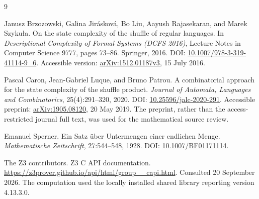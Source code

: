 \documentclass[11pt,letterpaper]{article}
\numberwithin{equation}{section}
\theoremstyle{definition}
\theoremstyle{remark}
\begin{document}
\begin{thebibliography}{9}
Janusz Brzozowski, Galina Jir\'askov\'a, Bo Liu, Aayush Rajasekaran,
and Marek Szyku\l a.
\newblock On the state complexity of the shuffle of regular languages.
\newblock In \emph{Descriptional Complexity of Formal Systems (DCFS 2016)},
Lecture Notes in Computer Science 9777, pages 73--86. Springer, 2016.
\newblock DOI: \href{https://doi.org/10.1007/978-3-319-41114-9_6}{10.1007/978-3-319-41114-9\_6}.
\newblock Accessible version:
\href{https://arxiv.org/abs/1512.01187v3}{arXiv:1512.01187v3}, 15 July 2016.

Pascal Caron, Jean-Gabriel Luque, and Bruno Patrou.
\newblock A combinatorial approach for the state complexity of the shuffle product.
\newblock \emph{Journal of Automata, Languages and Combinatorics},
25(4):291--320, 2020.
\newblock DOI: \href{https://doi.org/10.25596/jalc-2020-291}{10.25596/jalc-2020-291}.
\newblock Accessible preprint:
\href{https://arxiv.org/abs/1905.08120}{arXiv:1905.08120}, 20 May 2019.
\newblock The preprint, rather than the access-restricted journal full text,
was used for the mathematical source review.

Emanuel Sperner.
\newblock Ein Satz \"uber Untermengen einer endlichen Menge.
\newblock \emph{Mathematische Zeitschrift}, 27:544--548, 1928.
\newblock DOI: \href{https://doi.org/10.1007/BF01171114}{10.1007/BF01171114}.

The Z3 contributors.
\newblock Z3 C API documentation.
\newblock \url{https://z3prover.github.io/api/html/group__capi.html}.
\newblock Consulted 20 September 2026. The computation used the locally
installed shared library reporting version 4.13.3.0.
\end{thebibliography}
\end{document}
